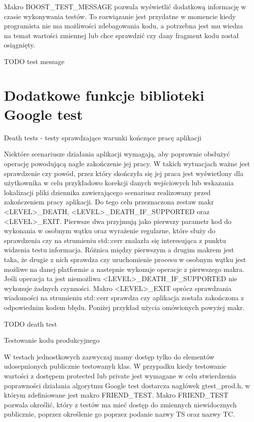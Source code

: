 \documentclass[12pt,a4paper,notitlepage]{report}
\begin{document}
Makro BOOST_TEST_MESSAGE pozwala wyświetlić dodatkową informację w czasie wykonywania testów. To rozwiązanie jest przydatne w momencie kiedy programista nie ma możliwości zdebagowania kodu, a potrzebna jest mu wiedza na temat wartości zmiennej lub chce sprawdzić czy dany fragment kodu został osiągnięty.

TODO test message

\chapter{Dodatkowe funkcje biblioteki Google test}

Death tests - testy sprawdzające warunki kończące pracę aplikacji

Niektóre scenariusze działania aplikacji wymagają, aby poprawnie obsłużyć operację powodującą nagłe zakończenie jej pracy. W takich wytuacjach ważne jest sprawdzenie czy powód, przez który skończyła się jej praca jest wyświetlony dla użytkownika w celu przykładowo korekcji danych wejściowych lub wskazania lokalizacji pliki dziennika zawierającego scenariusz realizowany przed zakończeniem pracy aplikacji.
Do tego celu przeznaczona zestaw makr <LEVEL>_DEATH, <LEVEL>_DEATH_IF_SUPPORTED oraz <LEVEL>_EXIT. 
Pierwsze dwa przyjmują jako pierwszy parametr kod do wykonania w osobnym wątku oraz wyrażenie regularne, które służy do sprawdzenia czy na strumieniu std::cerr znalazła się interesująca z punktu widzenia testu informacja. Różnica między pierwszym a drugim makrem jest taka, że drugie z nich sprawdza czy uruchomienie procesu w osobnym wątku jest możliwe na danej platformie a nastepnie wykonuje operacje z pierwszego makra. Jeśli operacja ta jest niemożliwa <LEVEL>_DEATH_IF_SUPPORTED nie wykonuje żadnych czynności.
Makro <LEVEL>_EXIT oprócz sprawdzania wiadomości na strumieniu std::cerr sprawdza czy aplikacja została zakończona z odpowiednim kodem błędu.
Poniżej przykład użycia omówionych powyżej makr.

TODO death test

Testowanie kodu produkcyjnego

W testach jednostkowych zazwyczaj mamy dostęp tylko do elementów udosepnionych publicznie testowanyh klas. W przypadku kiedy testowanie wartości z dostępem protected lub private jest wymagane w celu stwierdzenia poprawności działania algorytmu Google test dostarcza nagłówek gtest\gtest_prod.h, w którym zdefiniowane jest makro FRIEND_TEST.
Makro FRIEND_TEST pozwala określić, który z testów ma mieć dostęp do zmiennych niewidocznych publicznie, poprzez określenie go poprzez podanie nazwy TS oraz nazwy TC.
\end{document}
